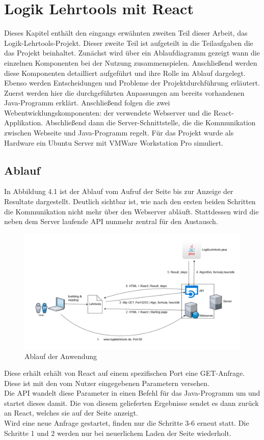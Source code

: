 
\chapter{Logik Lehrtools mit React}\label{Lehrtools}
Dieses Kapitel enthält den eingangs erwähnten zweiten Teil dieser Arbeit, das Logik-Lehrtools-Projekt. Dieser zweite Teil ist aufgeteilt in die Teilaufgaben die das Projekt beinhaltet. Zunächst wird über ein Ablaufdiagramm gezeigt wann die einzelnen Komponenten bei der Nutzung zusammenspielen. Anschließend werden diese Komponenten detailliert aufgeführt und ihre Rolle im Ablauf dargelegt. Ebenso werden Entscheidungen und Probleme der Projektdurchführung erläutert. Zuerst werden hier die durchgeführten Anpassungen am bereits vorhandenen Java-Programm erklärt. Anschließend folgen die zwei Webentwicklungskomponenten: der verwendete Webserver und die React-Applikation. Abschließend dann die Server-Schnittstelle, die die Kommunikation zwischen Webseite und Java-Programm regelt. Für das Projekt wurde als Hardware ein Ubuntu Server mit VMWare Workstation Pro simuliert. \\
\pagebreak
\section{Ablauf}
In Abbildung 4.1 ist der Ablauf vom Aufruf der Seite bis zur Anzeige der Resultate dargestellt. Deutlich sichtbar ist, wie nach den ersten beiden Schritten die Kommunikation nicht mehr über den Webserver abläuft. Stattdessen wird die neben dem Server laufende API nunmehr zentral für den Austausch.\\
\begin{figure}[H]
     \centerline{\includegraphics[width=15cm]{../Abbildungen/AblaufLehrtools.png}}
  \caption{Ablauf der Anwendung \cite{eig}}
  \label{fig1_1}
\end{figure}
\noindent Diese erhält erhält von React auf einem spezifischen Port eine GET-Anfrage. Diese ist mit den vom Nutzer eingegebenen Parametern versehen. \\
Die API wandelt diese Parameter in einen Befehl für das Java-Programm um und startet dieses damit. Die von diesem gelieferten Ergebnisse sendet es dann zurück an React, welches sie auf der Seite anzeigt.\\
Wird eine neue Anfrage gestartet, finden nur die Schritte 3-6 erneut statt. Die Schritte 1 und 2 werden nur bei neuerlichem Laden der Seite wiederholt.
